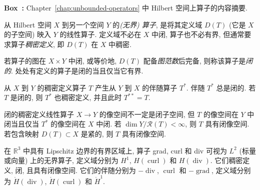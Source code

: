 \begin{MBSourceBox}
\label{box:unbounded-operators-summary}
\noindent\textbf{Box~\thebooksummary:} {Chapter~\ref{chap:unbounded-operators} 中 Hilbert 空间上算子的内容摘要.}\par

{从 Hilbert 空间 $X$ 到另一个空间 $Y$ 的\emph{(无界) 算子}, 是将其定义域 $D(T)$ (它是 $X$ 的子空间) 映入 $Y$ 的线性算子. 定义域不必在 $X$ 中闭, 算子也不必有界, 但通常要求算子\emph{稠密定义}, 即 $D(T)$ 在 $X$ 中稠密.}

{若算子的图在 $X\times Y$ 中闭, 或等价地, $D(T)$ 配备\emph{图范数}后完备, 则称该算子是\emph{闭的}. 处处有定义的算子是闭的当且仅当它有界.}

{从 $X$ 到 $Y$ 的稠密定义算子 $T$ 产生从 $Y$ 到 $X$ 的伴随算子 $T^*$. 伴随 $T^*$ 总是闭的. 若 $T$ 是闭的, 则 $T^*$ 也稠密定义, 并且此时 $T^{**}=T$.}

{闭的稠密定义线性算子 $X\to Y$ 的像空间不一定是闭子空间, 但 $T$ 的像空间在 $Y$ 中闭当且仅当 $T^*$ 的像空间在 $X$ 中闭. 若 $\dim Y/\mathcal R(T)<\infty$, 则 $T$ 具有闭像空间. 若包含映射 $D(T)\subset X$ 是紧的, 则 $T$ 具有闭像空间.}

{在 $\mathbb R^3$ 中具有 Lipschitz 边界的有界区域上, 算子 grad, curl 和 div 可视为 $L^2$ (标量或向量) 上的无界算子, 定义域分别为 $H^1$, $H(\operatorname{curl})$ 和 $H(\operatorname{div})$. 它们稠密定义, 闭, 且具有闭像空间. 它们的伴随分别为 $-\operatorname{div}$, $\operatorname{curl}$ 和 $-\operatorname{grad}$, 定义域分别为 $\mathring H(\operatorname{div})$, $\mathring H(\operatorname{curl})$ 和 $\mathring H^1$.}
\end{MBSourceBox}
